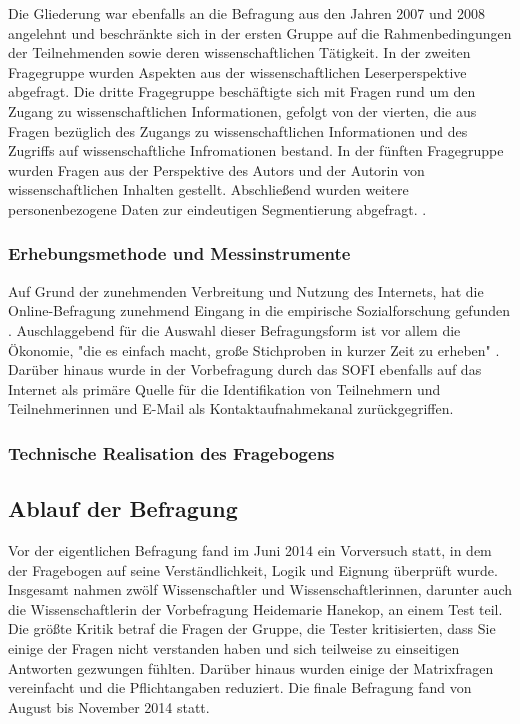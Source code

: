 Die Gliederung war ebenfalls an die Befragung aus den Jahren 2007 und 2008 angelehnt und beschränkte sich in der ersten Gruppe auf die Rahmenbedingungen der Teilnehmenden sowie deren wissenschaftlichen Tätigkeit. In der zweiten Fragegruppe wurden Aspekten aus der wissenschaftlichen Leserperspektive abgefragt. Die dritte Fragegruppe beschäftigte sich mit Fragen rund um den Zugang zu wissenschaftlichen Informationen, gefolgt von der vierten, die aus Fragen bezüglich des Zugangs zu wissenschaftlichen Informationen und des Zugriffs auf wissenschaftliche Infromationen bestand. In der fünften Fragegruppe wurden Fragen aus der Perspektive des Autors und der Autorin von wissenschaftlichen Inhalten gestellt. Abschließend wurden weitere personenbezogene Daten zur eindeutigen Segmentierung abgefragt. .

\subsubsection{Erhebungsmethode und Messinstrumente}

Auf Grund der zunehmenden Verbreitung und Nutzung des Internets, hat die Online-Befragung zunehmend Eingang in die empirische Sozialforschung gefunden \cite{Pannewitz_2002}. Auschlaggebend für die Auswahl dieser Befragungsform ist vor allem die Ökonomie, "die es einfach macht, große Stichproben in kurzer Zeit zu erheben" \cite{eichhorn_2004_online}. Darüber hinaus wurde in der Vorbefragung durch das SOFI ebenfalls auf das Internet als primäre Quelle für die Identifikation von Teilnehmern und Teilnehmerinnen und E-Mail als Kontaktaufnahmekanal zurückgegriffen.

\subsubsection{Technische Realisation des Fragebogens}

\subsection{Ablauf der Befragung}
Vor der eigentlichen Befragung fand im Juni 2014 ein Vorversuch statt, in dem der Fragebogen auf seine Verständlichkeit, Logik und Eignung überprüft wurde. Insgesamt nahmen zwölf Wissenschaftler und Wissenschaftlerinnen, darunter auch die Wissenschaftlerin der Vorbefragung Heidemarie Hanekop, an einem Test teil. Die größte Kritik betraf die Fragen der Gruppe, die Tester kritisierten, dass Sie einige der Fragen nicht verstanden haben und sich teilweise zu einseitigen Antworten gezwungen fühlten. Darüber hinaus wurden einige der Matrixfragen vereinfacht und die Pflichtangaben reduziert. Die finale Befragung fand von August bis November 2014 statt.

